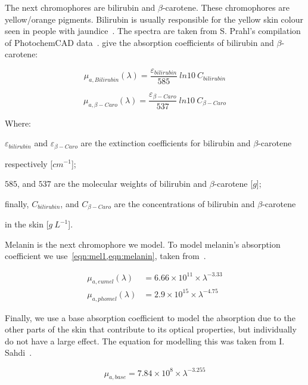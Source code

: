 The next chromophores are bilirubin and $\beta$-carotene.
These chromophores are yellow/orange pigments. 
Bilirubin is usually responsible for the yellow skin colour seen in people with jaundice~\cite{jacques1997developing}.
The spectra are taken from S. Prahl's compilation of PhotochemCAD data~\cite{prahlcaro,prahlbili}.
 give the absorption coefficients of bilirubin and $\beta$-carotene:

\begin{equation}
\mu_{a,Bilirubin}(\lambda)=\frac{\varepsilon_{bilirubin}}{585}\ ln10\ C_{bilirubin}
\label{eqn:bili}
\end{equation}

\begin{equation}
\mu_{a,\beta-Caro}(\lambda)=\frac{\varepsilon_{\beta-Caro}}{537}\ ln10\ C_{\beta-Caro}
\label{eqn:caro}
\end{equation}

\noindent Where:

\indent $\varepsilon_{bilirubin}$ and $\varepsilon_{\beta-Caro}$ are the extinction coefficients for bilirubin and $\beta$-carotene 

\indent respectively [$cm^{-1}$];

\indent $585$, and $537$ are the molecular weights of bilirubin and $\beta$-carotene [$g$];

\indent finally, $C_{bilirubin}$, and $C_{\beta-Caro}$ are the concentrations of bilirubin and $\beta$-carotene 

\indent in the skin [$g\ L^{-1}$].

\medskip

Melanin is the next chromophore we model.
To model melanin's absorption coefficient we use~\cref{eqn:mel1,eqn:melanin}, taken from~\cite{iglesias2015biophysically}.

\begin{align}
\mu_{a,eumel}(\lambda)&=6.66\times10^{11} \times \lambda^{-3.33}\label{eqn:mel1}\\
\mu_{a,phomel}(\lambda)&=2.9\times10^{15} \times \lambda^{-4.75}
\label{eqn:melanin}
\end{align}

Finally, we use a base absorption coefficient to model the absorption due to the other parts of the skin that contribute to its optical properties, but individually do not have a large effect.
The equation for modelling this was taken from I. Sahdi~\cite{saidi1992transcutaneous}.

\begin{equation}
\mu_{a,base}=7.84\times10^{8}\times\lambda^{-3.255}
\label{eqn:base}
\end{equation}


